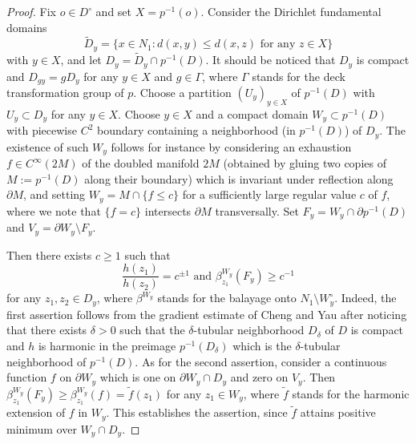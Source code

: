 \documentclass[12pt,a4paper]{amsart}
\numberwithin{equation}{section}
\theoremstyle{definition}
\begin{document}
\begin{proof}
Fix $o \in D^\circ$ and set $X = p^{-1}(o)$. Consider the Dirichlet fundamental domains
\[
\tilde{D}_y = \{ x \in N_1 : d(x,y) \leq d(x,z) \text{ for any } z \in  X\}
\]
with $y \in X$, and let $D_y = \tilde{D}_y \cap p^{-1}(D)$. It should be noticed that $D_y$ is compact and $D_{gy} = g D_y$ for any $y \in X$ and $g \in \Gamma$, where $\Gamma$ stands for the deck transformation group of $p$. Choose a partition $(U_y)_{y \in X}$ of $p^{-1}(D)$ with $U_y \subset D_y$ for any $y \in X$. Choose $y \in X$ and a compact domain $W_y \subset p^{-1}(D)$ with piecewise $C^2$ boundary containing a neighborhood (in $p^{-1}(D)$) of $D_y$. 
The existence of such $W_y$ follows for instance by considering an exhaustion $f \in C^\infty(2M)$ of the doubled manifold $2M$ (obtained by gluing two copies of $M:=p^{-1}(D)$ along their boundary) which is invariant under reflection along $\partial M$, and setting $W_y = M \cap \{ f \leq c \}$ for a sufficiently large regular value $c$ of $f$, where we note that $\{f = c\}$ intersects $\partial M$ transversally. Set $F_y = W_y \cap \partial p^{-1}(D)$ and $V_y = \partial W_y \setminus F_y$. 

Then there exists $c \geq 1$ such that
\begin{equation}\label{est}
\frac{h(z_1)}{h(z_2)} = c^{\pm 1} \text{ and } \beta^{W_y}_{z_1}(F_y) \geq c^{-1}
\end{equation}
for any $z_1,z_2 \in D_y$, where $\beta^{W_y}$ stands for the balayage onto $N_1 \setminus W_y^\circ$. Indeed, the first assertion follows from the gradient estimate of Cheng and Yau \cite[Theorem 6]{CY} after noticing that there exists $\delta > 0$ such that the $\delta$-tubular neighborhood $D_\delta$ of $D$ is compact and $h$ is harmonic in the preimage $p^{-1}(D_\delta)$ which is the $\delta$-tubular neighborhood of $p^{-1}(D)$. As for the second assertion, consider a continuous function $f$ on $\partial W_y$ which is one on $\partial W_y \cap D_y$ and zero on $V_y$. Then $\beta^{W_y}_{z_1}(F_y) \geq \beta^{W_y}_{z_1}(f) = \tilde{f}(z_1)$ for any $z_1 \in W_y$, where $\tilde{f}$ stands for the harmonic extension of $f$ in $W_y$. This establishes the assertion, since $\tilde{f}$ attains positive minimum over $W_y \cap D_y$.


\end{proof}
\end{document}
